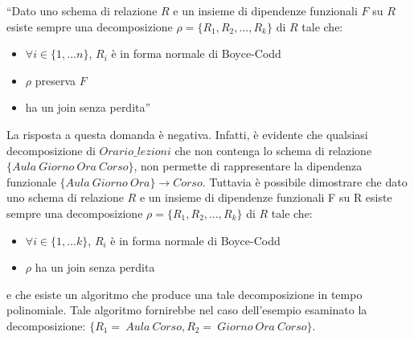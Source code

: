 ``Dato uno schema di relazione $R$ e un insieme di dipendenze funzionali $F$ su $R$ esiste sempre una decomposizione 
$\rho=\{R_1, R_2, \ldots, R_k\}$ di $R$ tale che:
\begin{itemize}
 \item $\forall i \in \{1, \ldots n\}$, $R_i$ è in forma normale di Boyce-Codd
 \item $\rho$ preserva $F$
 \item ha un join senza perdita''
\end{itemize}

La risposta a questa domanda è negativa. Infatti, è evidente che qualsiasi decomposizione di $Orario\_lezioni$ che non 
contenga lo schema di relazione $\{Aula\ Giorno\ Ora\ Corso\}$, non permette di rappresentare la dipendenza funzionale
$\{Aula\ Giorno\ Ora\} \rightarrow Corso$. Tuttavia è possibile dimostrare che dato uno schema di relazione $R$ e un 
insieme di dipendenze funzionali F su R esiste sempre una decomposizione $\rho=\{R_1, R_2, \ldots, R_k\}$ di $R$ tale 
che:
\begin{itemize}
 \item $\forall i \in \{1, \ldots k\}$, $R_i$ è in forma normale di Boyce-Codd
 \item $\rho$ ha un join senza perdita
\end{itemize}
e che esiste un algoritmo che produce una tale decomposizione in tempo polinomiale. Tale algoritmo fornirebbe nel caso 
dell'esempio esaminato la decomposizione: $\{R_1 =\ Aula\ Corso, R_2 =\ Giorno\ Ora\ Corso\}$.